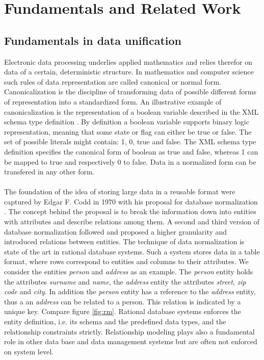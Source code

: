 \chapter{Fundamentals and Related Work\label{cha:chapter2}}

\section{Fundamentals in data unification\label{sec:unification}}

Electronic data processing underlies applied mathematics and relies therefor on data of a certain, deterministic structure. In mathematics and computer science such rules of data representation are called canonical or normal form. Canonicalization is the discipline of transforming data of possible different forms of representation into a standardized form. An illustrative example of canonicalization is the representation of a boolean variable described in the XML schema type definition
. By definition a boolean variable supports binary logic representation, meaning that some state or flag can either be true or false. The set of possible literals might contain: 1, 0, true and false. The XML schema type definition specifies the canonical form of boolean as true and false, whereas 1 can be mapped to true and respectively 0 to false. Data in a normalized form can be transfered in any other form.
\\\\
The foundation of the idea of storing large data in a reusable format were captured by Edgar F. Codd in 1970 with his proposal for database normalization
. The concept behind the proposal is to break the information down into entities with attributes and describe relations among them. A second and third version of database normalization followed and proposed a higher granularity and introduced relations between entities. The technique of data normalization is state of the art in rational database systems. Such a system stores data in a table format, where rows correspond to entities and columns to their attributes. We consider the entities \textit{person} and \textit{address} as an example. The \textit{person} entity holds the attributes \textit{surname} and \textit{name}, the \textit{address} entity the attributes \textit{street}, \textit{zip code} and \textit{city}. In addition the \textit{person} entity has a reference to the \textit{address} entity, thus a an \textit{address} can be related to a person. This relation is indicated by a unique key. Compare figure \ref{fig:rm}. Rational database systems enforces the entity definition, i.e. its schema and the predefined data types, and the relationship constraints strictly. Relationship modeling plays also a fundamental role in other data base and data management systems but are often not enforced on system level.

